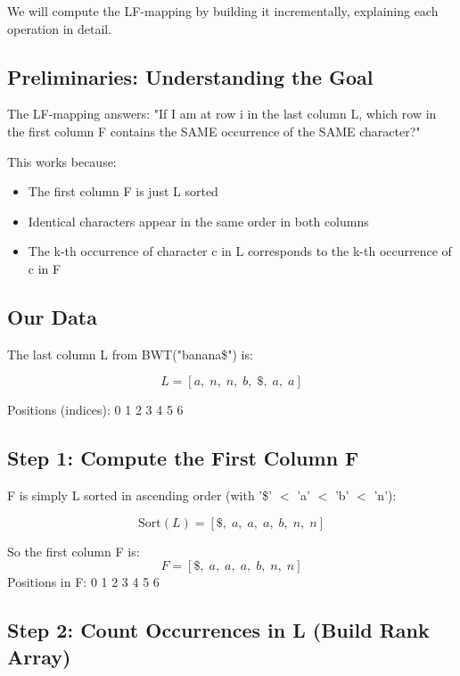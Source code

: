 \begin{examplebox}

We will compute the LF-mapping by building it incrementally, explaining each operation in detail.

\subsection*{Preliminaries: Understanding the Goal}

The LF-mapping answers: "If I am at row i in the last column L, which row in the first column F contains the SAME occurrence of the SAME character?"

This works because:
\begin{itemize}
    \item The first column F is just L sorted
    \item Identical characters appear in the same order in both columns
    \item The k-th occurrence of character c in L corresponds to the k-th occurrence of c in F
\end{itemize}

\subsection*{Our Data}

The last column L from BWT("banana\$") is:

\[
L = [a,\; n,\; n,\; b,\; \$,\; a,\; a]
\]

Positions (indices):     0    1    2    3    4    5    6

\subsection*{Step 1: Compute the First Column F}

F is simply L sorted in ascending order (with '\$' $<$ 'a' $<$ 'b' $<$ 'n'):

\[
\text{Sort}(L) = [\$,\; a,\; a,\; a,\; b,\; n,\; n]
\]

So the first column F is:
\[
F = [\$,\; a,\; a,\; a,\; b,\; n,\; n]
\]
Positions in F:           0    1    2    3    4    5    6

\subsection*{Step 2: Count Occurrences in L (Build Rank Array)}


\end{examplebox}
